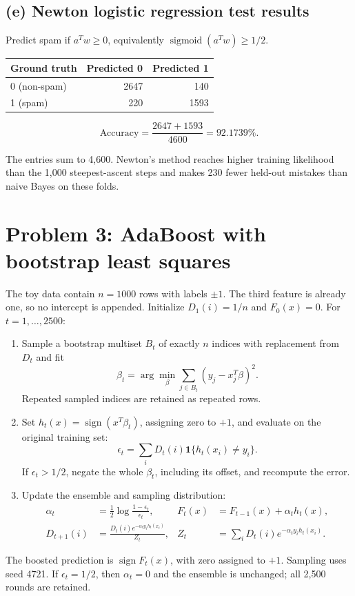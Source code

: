 \documentclass[10pt]{article}
\newcommand{\sigmoid}{\operatorname{sigmoid}}
\newcommand{\ind}{\mathbf{1}}
\begin{document}
\subsection*{(e) Newton logistic regression test results}
Predict spam if $a^Tw\ge0$, equivalently $\sigmoid(a^Tw)\ge1/2$.
\begin{center}
\begin{tabular}{lrr}\toprule
Ground truth & Predicted 0 & Predicted 1\\\midrule
0 (non-spam) & 2647 & 140\\
1 (spam) & 220 & 1593\\\bottomrule
\end{tabular}\qquad
\begin{minipage}{0.35\linewidth}
\[\text{Accuracy}=\frac{2647+1593}{4600}=92.1739\%.\]
\end{minipage}
\end{center}
The entries sum to 4,600. Newton's method reaches higher training likelihood than the 1,000 steepest-ascent steps and makes 230 fewer held-out mistakes than naive Bayes on these folds.

\clearpage
\section*{Problem 3: AdaBoost with bootstrap least squares}
The toy data contain $n=1000$ rows with labels $\pm1$. The third feature is already one, so no intercept is appended.
Initialize $D_1(i)=1/n$ and $F_0(x)=0$. For $t=1,\ldots,2500$:
\begin{enumerate}
\item Sample a bootstrap multiset $B_t$ of exactly $n$ indices with replacement from $D_t$ and fit
\[\beta_t=\arg\min_\beta\sum_{j\in B_t}(y_j-x_j^T\beta)^2.\]
Repeated sampled indices are retained as repeated rows.
\item Set $h_t(x)=\operatorname{sign}(x^T\beta_t)$, assigning zero to $+1$, and evaluate on the original training set:
\[\epsilon_t=\sum_iD_t(i)\ind\{h_t(x_i)\ne y_i\}.\]
If $\epsilon_t>1/2$, negate the whole $\beta_t$, including its offset, and recompute the error.
\item Update the ensemble and sampling distribution:
\begin{align*}
\alpha_t&=\frac12\log\frac{1-\epsilon_t}{\epsilon_t},
&F_t(x)&=F_{t-1}(x)+\alpha_t h_t(x),\\
D_{t+1}(i)&=\frac{D_t(i)e^{-\alpha_t y_i h_t(x_i)}}{Z_t},
&Z_t&=\sum_iD_t(i)e^{-\alpha_t y_i h_t(x_i)}.
\end{align*}
\end{enumerate}
The boosted prediction is $\operatorname{sign}F_t(x)$, with zero assigned to $+1$.
Sampling uses seed 4721. If $\epsilon_t=1/2$, then $\alpha_t=0$ and the ensemble is unchanged; all 2,500 rounds are retained.
\end{document}
